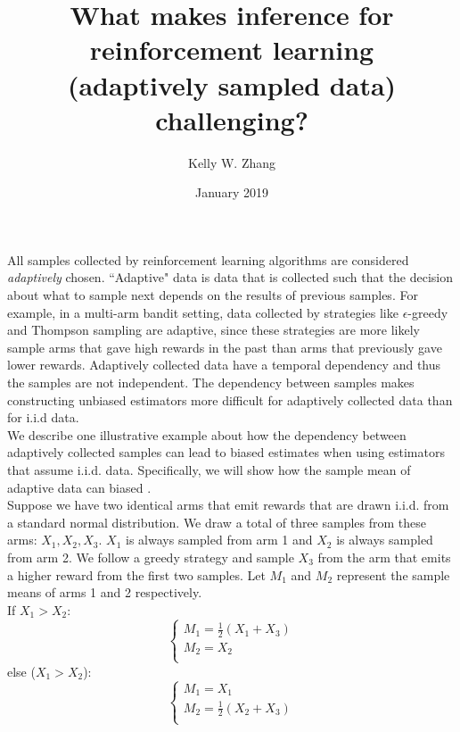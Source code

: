 \documentclass{article}
\begin{document}
\title{What makes inference for reinforcement learning \\ (adaptively sampled data) challenging?}
\author{Kelly W. Zhang} 
\date{January 2019}
\maketitle

All samples collected by reinforcement learning algorithms are considered \textit{adaptively} chosen.
``Adaptive" data is data that is collected such that the decision about what to sample next depends on the results of previous samples.
For example, in a multi-arm bandit setting, data collected by strategies like $\epsilon$-greedy and Thompson sampling are adaptive, since these strategies are more likely sample arms that gave high rewards in the past than arms that previously gave lower rewards.
Adaptively collected data have a temporal dependency and thus the samples are not independent.
The dependency between samples makes constructing unbiased estimators more difficult for adaptively collected data than for i.i.d data. \\

We describe one illustrative example about how the dependency between adaptively collected samples can lead to biased estimates when using estimators that assume i.i.d. data.
Specifically, we will show how the sample mean of adaptive data can biased \cite{nie2018}. \\

Suppose we have two identical arms that emit rewards that are drawn i.i.d. from a standard normal distribution.
We draw a total of three samples from these arms: $X_1, X_2, X_3$.
$X_1$ is always sampled from arm 1 and $X_2$ is always sampled from arm 2.
We follow a greedy strategy and sample $X_3$ from the arm that emits a higher reward from the first two samples.
Let $M_1$ and $M_2$ represent the sample means of arms 1 and 2 respectively. \\

If $X_1 > X_2$:
$$\begin{cases}
    M_1 = \frac{1}{2} (X_1 + X_3) \\
    M_2 = X_2 \\
\end{cases}$$
else ($X_1 > X_2$):
$$\begin{cases}
    M_1 = X_1 \\
    M_2 = \frac{1}{2} (X_2 + X_3) \\
\end{cases}$$
\end{document}
